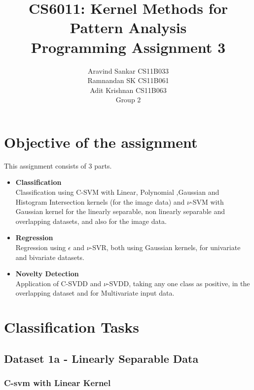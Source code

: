 \documentclass{article}
\begin{document}
\title{\textbf{CS6011: Kernel Methods for Pattern Analysis}
\\
\textbf{Programming Assignment 3}
}
\author{Aravind Sankar CS11B033 \\
Ramnandan SK CS11B061 \\
Adit Krishnan CS11B063 \\[0.2in]
Group 2
}
\maketitle
\tableofcontents 
\newpage
\section{Objective of the assignment}
This assignment consists of 3 parts. 
\begin{itemize}
\item \textbf{Classification} \\[5pt]
Classification using C-SVM with Linear, Polynomial ,Gaussian and Histogram Intersection kernels (for the image data) and $\nu$-SVM with Gaussian kernel for the linearly separable, non linearly separable and overlapping datasets, and also for the image data. \\[10pt]
\item \textbf{Regression} \\[5pt]
Regression using $\epsilon$ and $\nu$-SVR, both using Gaussian kernels, for univariate and bivariate datasets. \\[10pt]
\item \textbf{Novelty Detection}\\[5pt] 
Application of C-SVDD and $\nu$-SVDD, taking any one class as positive, in the overlapping dataset and for Multivariate input data. \\[10pt]
\end{itemize}


\section{Classification Tasks}





\subsection{Dataset 1a - Linearly Separable Data}



\subsubsection{C-svm with Linear Kernel}
\end{document}
